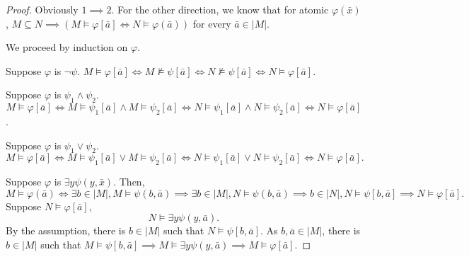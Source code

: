 \documentclass{report}
\begin{document}
\begin{proof}
    Obviously $1 \implies 2$. For the other direction, we know that for atomic $\varphi(\bar x)$, $M \subseteq N \implies ( M \models \varphi[\bar a] \iff N \models \varphi(\bar a))$ for every $\bar a \in |M|$. 

    We proceed by induction on $\varphi$. 

    Suppose $\varphi$ is $\neg \psi$. $M \models \varphi[\bar a] \iff M \not\models \psi[\bar a] \iff N \not \models \psi[\bar a] \iff N \models \varphi [\bar a]$.

    Suppose $\varphi$ is $\psi_1 \land \psi_2$. \[M \models \varphi[\bar a] \iff M \models \psi_1[\bar a] \land M \models \psi_2[\bar a] \iff N \models \psi_1[\bar a] \land N \models \psi_2[\bar a] \iff N \models \varphi [\bar a]\].

    Suppose $\varphi$ is $\psi_1 \lor \psi_2$. \[M \models \varphi[\bar a] \iff M \models \psi_1[\bar a] \lor M \models \psi_2[\bar a] \iff N \models \psi_1[\bar a] \lor N \models \psi_2[\bar a] \iff N \models \varphi [\bar a].\]

    Suppose $\varphi$ is $\exists y \psi(y, \bar x)$. Then,
    \[
        M \models \varphi(\bar a) \iff \exists b \in |M|, M \models \psi(b, \bar a) \implies \exists b \in |M|, N \models \psi(b, \bar a) \implies b \in |N|, N \models \psi[b, \bar a] \implies N \models \varphi[\bar a].
    \]
    Suppose $N \models \varphi[\bar a]$, \[
        N \models \exists y \psi(y, \bar a).
    \]
    By the assumption, there is $b \in |M|$ such that $N \models \psi[b, \bar a]$. As $b, \bar a \in |M|$, there is $b \in |M|$ such that $M \models \psi[b, \bar a] \implies M \models \exists y \psi(y, \bar a) \implies M \models \varphi[\bar a]$.
\end{proof}
\newpage
{}
\end{document}
